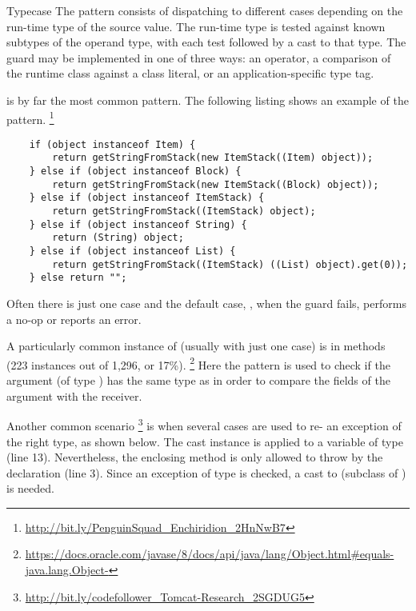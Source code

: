 \begin{pattern}{Typecase}
The \thisp{} pattern consists of dispatching to different cases
depending on the run-time type of the source value.
The run-time type is tested against known subtypes of the operand type,
with each test followed by a cast to that type.
The guard may be implemented in one of three ways: an  operator,
a comparison of the runtime class against a class literal,
or an application-specific type tag.

\instances{}
\thisp{} is by far the most common pattern.
The following listing shows an example of the \thisp{} pattern.%
\footnote{\url{http://bit.ly/PenguinSquad_Enchiridion_2HnNwB7}}

\begin{verbatim}
	if (object instanceof Item) {
		return getStringFromStack(new ItemStack((Item) object));
	} else if (object instanceof Block) {
		return getStringFromStack(new ItemStack((Block) object));
	} else if (object instanceof ItemStack) {
		return getStringFromStack((ItemStack) object);
	} else if (object instanceof String) {
		return (String) object;
	} else if (object instanceof List) {
		return getStringFromStack((ItemStack) ((List) object).get(0));
	} else return "";
\end{verbatim}

Often there is just one case and the default case, \ie, when the guard
fails, performs a no-op or reports an error.

A particularly common instance of \thisp{} (usually with just one case) is in  methods (223
instances out of 1,296, or 17\%).%
\footnote{\url{https://docs.oracle.com/javase/8/docs/api/java/lang/Object.html\#equals-java.lang.Object-}}
Here the pattern is used to check if the argument (of type ) has the same type as 
in order to compare the fields of the argument with the receiver.

Another common scenario%
\footnote{\url{http://bit.ly/codefollower_Tomcat-Research_2SGDUG5}}
is when several cases are used to re- an exception of the right type, as shown below.
The cast instance is applied to a variable of type 
(line 13).
Nevertheless, the enclosing method is only allowed to throw  by the  declaration (line 3).
Since an exception of type  is checked,
a cast to  (subclass of ) is needed.


\end{pattern}
